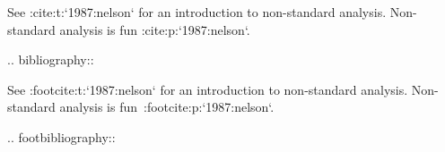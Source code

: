 See :cite:t:`1987:nelson` for an introduction to non-standard analysis.
Non-standard analysis is fun :cite:p:`1987:nelson`.

.. bibliography::


See :footcite:t:`1987:nelson` for an introduction to non-standard analysis.
Non-standard analysis is fun\ :footcite:p:`1987:nelson`.

.. footbibliography::